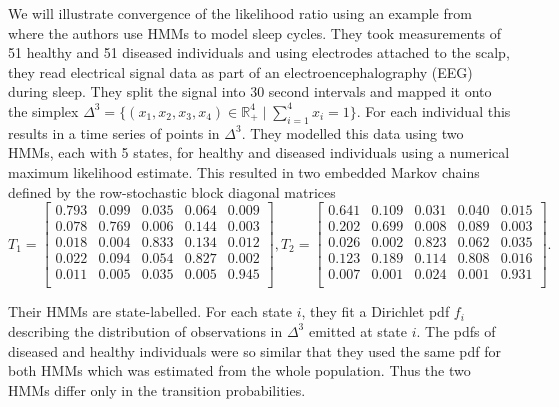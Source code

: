\documentclass[a4paper,UKenglish,cleveref, autoref,mathscr]{lipics-v2019}
\newcommand{\RR}{\mathbb{R}}
\newcommand{\1}{\mathbbm{1}}
\begin{document}
\begin{example}\label{sleepcycles}
We will illustrate convergence of the likelihood ratio using an example from \cite{rockhart13} where the authors use HMMs to model sleep cycles. They took measurements of 51 healthy and 51 diseased individuals and using electrodes attached to the scalp, they read electrical signal data as part of an electroencephalography (EEG) during sleep. They split the signal into 30 second intervals and mapped it onto the simplex $\Delta^3 = \{(x_1, x_2, x_3, x_4) \in \RR^4_+ \mid \sum_{i = 1}^4 x_i = 1\}$. For each individual this results in a time series of points in $\Delta^3$. They modelled this data using two HMMs, each with 5 states, for healthy and diseased individuals using a numerical maximum likelihood estimate. This resulted in two embedded Markov chains defined by the row-stochastic block diagonal matrices
\begin{equation*}T_1 = \begin{bmatrix}
0.793 & 0.099 & 0.035 & 0.064 &	0.009 \\
0.078 & 0.769 & 0.006 & 0.144 & 0.003 \\
0.018 & 0.004 & 0.833 & 0.134 & 0.012  \\
0.022 & 0.094 & 0.054 & 0.827 & 0.002 \\
0.011 & 0.005 & 0.035 & 0.005 & 0.945  \\
\end{bmatrix}, T_2 = \begin{bmatrix}
0.641 & 0.109 & 0.031 & 0.040 & 0.015 \\
0.202 & 0.699 & 0.008 & 0.089 & 0.003 \\
0.026 & 0.002 & 0.823 & 0.062 & 0.035 \\
0.123 & 0.189 & 0.114 & 0.808 & 0.016 \\
0.007 & 0.001 & 0.024 & 0.001 & 0.931 \\
\end{bmatrix}.
\end{equation*}

Their HMMs are state-labelled. For each state $i$, they fit a Dirichlet pdf $f_i$ describing the distribution of observations in $\Delta^3$ emitted at state $i$. The pdfs of diseased and healthy individuals were so similar that they used the same pdf for both HMMs which was estimated from the whole population. Thus the two HMMs differ only in the transition probabilities.


\end{example}
\end{document}
